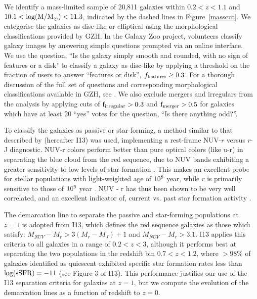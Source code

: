 \documentclass[useAMS,usenatbib]{mn2e}
\begin{document}
We identify a mass-limited sample of 20,811 galaxies within $0.2<z<1.1$ and $10.1<\rm \log(M/M_{\odot})<11.3$, indicated by the dashed lines in Figure~\ref{masscut}. We categorise the galaxies as disc-like or elliptical using the morphological classifications provided by GZH. In the Galaxy Zoo project, volunteers classify galaxy images by answering simple questions prompted via an online interface. We use the question, ``Is the galaxy simply smooth and rounded, with no sign of features or a disk" to classify a galaxy as disc-like by applying a threshold on the fraction of users to answer ``features or disk'', $f_{\rm features}\ge0.3$. For a thorough discussion of the full set of questions and corresponding morphological classifications available in GZH, see \citet{Willett2017}. We also exclude mergers and irregulars from the analysis by applying cuts of $\rm f_{irregular} > 0.3$ and $\rm f_{merger} > 0.5$ for galaxies which have at least 20 ``yes'' votes for the question, ``Is there anything odd?''. 

To classify the galaxies as passive or star-forming, a method similar to that described by \citet{Ilbert2013} (hereafter I13) was used, implementing a rest-frame NUV-$r$ versus $r$-J diagnostic. NUV-r colors perform better than pure optical colors (like u-r) in separating the blue cloud from the red sequence, due to NUV bands exhibiting a greater sensitivity to low levels of star-formation \citep{Martin2007,Wyder2007}. This makes an excellent probe for stellar populations with light-weighted age of $\rm 10^8$ year, while $r$ is primarily sensitive to those of $\rm 10^9$ year \citep{Arnouts2007a}. NUV - r has thus been shown to be very well correlated, and an excellent indicator of, current vs. past star formation activity \citep{Martin2005,Salim2005a}.  

The demarcation line to separate the passive and star-forming populations at $z=1$ is adopted from I13, which defines the red sequence galaxies as those which satisfy: $M_{NUV}-M_{r} > 3(M_{r}-M_{J})+1$ and $M_{NUV}-M_{r} > 3.1$. I13 applies this criteria to all galaxies in a range of $0.2<z<3$, although it performs best at separating the two populations in the redshift bin $0.7<z<1.2$, where $>98\%$ of galaxies identified as quiescent exhibited specific star formation rates less than $\rm \log(sSFR) = -11$ (see Figure 3 of I13). This performance justifies our use of the I13 separation criteria for galaxies at $z=1$, but we compute the evolution of the demarcation lines as a function of redshift to $z=0$. 
\end{document}
